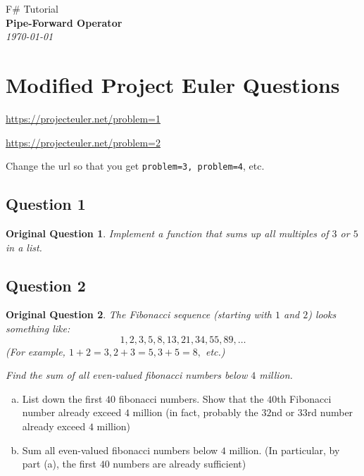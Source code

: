 \documentclass[12pt]{article}
\newtheorem*{origQuestion*}{Original Question}
\begin{document}
\begin{center}

{\large F\# Tutorial\\} \vspace{2mm}
\textbf{\LARGE Pipe-Forward Operator}\\
\vspace{1.5mm}
{\Large\emph{\today}}

\end{center}


\section{Modified Project Euler Questions}
\begin{flushleft}

\url{https://projecteuler.net/problem=1}

\url{https://projecteuler.net/problem=2}
\end{flushleft}

Change the url so that you get \texttt{problem=3, problem=4}, etc.

\subsection*{Question 1} 


\begin{origQuestion*}
Implement a function that sums up all multiples of $3$ or $5$ in a list.
\end{origQuestion*}

\subsection*{Question 2} 
\begin{origQuestion*}
The Fibonacci sequence (starting with $1$ and $2$) looks something like:
\[
1, 2, 3, 5, 8, 13, 21, 34, 55, 89, \ldots
\]
(For example, $1 + 2 = 3, 2 + 3 = 5, 3 + 5 = 8,$ etc.)

Find the sum of all even-valued fibonacci numbers below $4$ million.
\end{origQuestion*}
\begin{enumerate}[(a)]
\item List down the first $40$ fibonacci numbers. Show that the $40$th Fibonacci number already exceed $4$ million (in fact, probably the $32$nd or $33$rd number already exceed $4$ million)
\item Sum all even-valued fibonacci numbers below $4$ million. (In particular, by part (a), the first $40$ numbers are already sufficient)
\end{enumerate}
\end{document}
